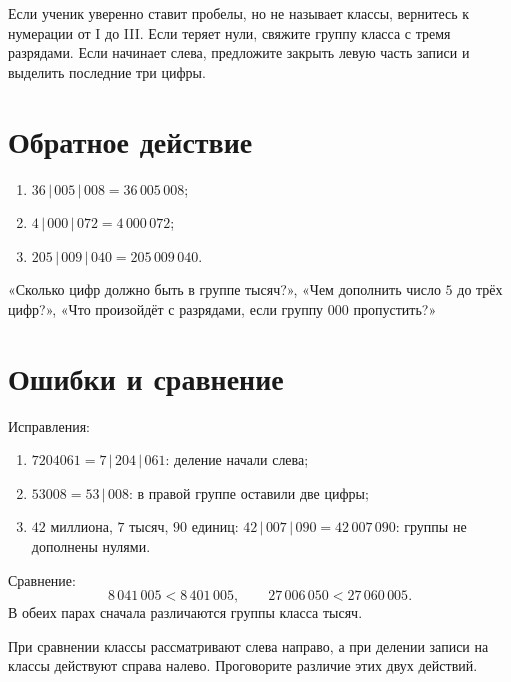 \begin{teacherbox}[Диагностика]
  Если ученик уверенно ставит пробелы, но не называет классы, вернитесь к
  нумерации от I до III. Если теряет нули, свяжите группу класса с тремя разрядами.
  Если начинает слева, предложите закрыть левую часть записи и выделить
  последние три цифры.
\end{teacherbox}

\section{Обратное действие}

\begin{enumerate}
  \item \(36\,|\,005\,|\,008=36\,005\,008\);
  \item \(4\,|\,000\,|\,072=4\,000\,072\);
  \item \(205\,|\,009\,|\,040=205\,009\,040\).
\end{enumerate}

\begin{teacherbox}
  «Сколько цифр должно быть в группе тысяч?», «Чем дополнить число \(5\) до
  трёх цифр?», «Что произойдёт с разрядами, если группу \(000\) пропустить?»
\end{teacherbox}

\newpage
\section{Ошибки и сравнение}

Исправления:
\begin{enumerate}
  \item \(7204061=7\,|\,204\,|\,061\): деление начали слева;
  \item \(53008=53\,|\,008\): в правой группе оставили две цифры;
  \item \(42\) миллиона, \(7\) тысяч, \(90\) единиц:
    \(42\,|\,007\,|\,090=42\,007\,090\): группы не дополнены нулями.
\end{enumerate}

Сравнение:
\[
  8\,041\,005<8\,401\,005,
  \qquad
  27\,006\,050<27\,060\,005.
\]
В обеих парах сначала различаются группы класса тысяч.

\begin{teacherbox}[Важно]
  При сравнении классы рассматривают слева направо, а при делении записи на
  классы действуют справа налево. Проговорите различие этих двух действий.
\end{teacherbox}

